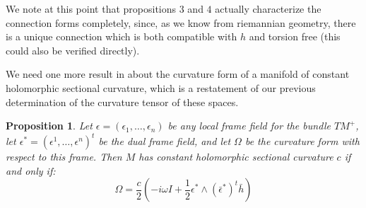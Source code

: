\documentclass[11pt]{amsart}
\newtheorem{prop}[subsection]{Proposition}
\theoremstyle{definition}
\begin{document}
We note at this point that propositions $3$ and $4$ actually characterize the connection forms completely, since, as we know from riemannian geometry, there is a unique connection which is both compatible with $h$ and torsion free (this could also be verified directly).

We need one more result in about the curvature form of a manifold of constant holomorphic sectional curvature, which is a restatement of our previous determination of the curvature tensor of these spaces.

\begin{prop}  Let $\epsilon = (\epsilon_1, \ldots, \epsilon_n )$ be any local frame field for the bundle $TM^{+}$, let $\epsilon^{\ast} = ( \epsilon^1, \ldots, \epsilon^n )^{t} $ be the dual frame field, and let $\Omega$ be the curvature form with respect to this frame.  Then $M$ has constant holomorphic sectional curvature $c$ if and only if:
%
$$ \Omega = \frac{c}{2} \left( - i \omega I + \frac{1}{2} \epsilon^{\ast} \wedge (\bar{ \epsilon }^{\ast})^{t} \bar{h} \right) $$
%
\end{prop}
\end{document}

